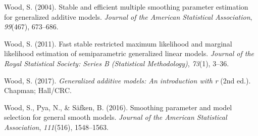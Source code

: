 \documentclass[print]{nuthesis}
\newlength{\cslhangindent}
\newenvironment{CSLReferences}[2]%
{\setlength{\parindent}{0pt}%
\everypar{\setlength{\hangindent}{\cslhangindent}}\ignorespaces}%
{\par}
\begin{document}
\begin{CSLReferences}{1}{0}
\leavevmode{}%
Wood, S. (2004). Stable and efficient multiple smoothing parameter estimation for generalized additive models. \emph{Journal of the American Statistical Association}, \emph{99}(467), 673--686.

\leavevmode{}%
Wood, S. (2011). Fast stable restricted maximum likelihood and marginal likelihood estimation of semiparametric generalized linear models. \emph{Journal of the Royal Statistical Society: Series B (Statistical Methodology)}, \emph{73}(1), 3--36.

\leavevmode{}%
Wood, S. (2017). \emph{Generalized additive models: An introduction with r} (2nd ed.). Chapman; Hall/CRC.

\leavevmode{}%
Wood, S., Pya, N., \& Säfken, B. (2016). Smoothing parameter and model selection for general smooth models. \emph{Journal of the American Statistical Association}, \emph{111}(516), 1548--1563.

\end{CSLReferences}


\backmatter

% 






\end{document}
